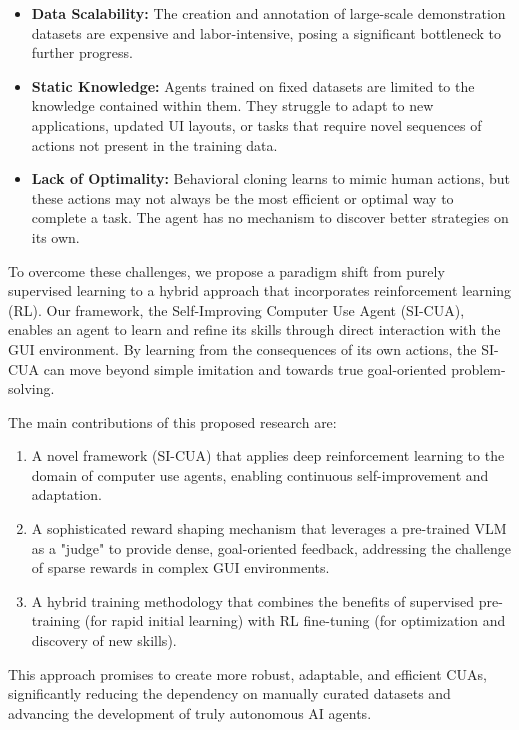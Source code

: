 \documentclass{article}
\begin{document}
\begin{itemize}
    \item \textbf{Data Scalability:} The creation and annotation of large-scale demonstration datasets are expensive and labor-intensive, posing a significant bottleneck to further progress.
    \item \textbf{Static Knowledge:} Agents trained on fixed datasets are limited to the knowledge contained within them. They struggle to adapt to new applications, updated UI layouts, or tasks that require novel sequences of actions not present in the training data.
    \item \textbf{Lack of Optimality:} Behavioral cloning learns to mimic human actions, but these actions may not always be the most efficient or optimal way to complete a task. The agent has no mechanism to discover better strategies on its own.
\end{itemize}

To overcome these challenges, we propose a paradigm shift from purely supervised learning to a hybrid approach that incorporates reinforcement learning (RL). Our framework, the Self-Improving Computer Use Agent (SI-CUA), enables an agent to learn and refine its skills through direct interaction with the GUI environment. By learning from the consequences of its own actions, the SI-CUA can move beyond simple imitation and towards true goal-oriented problem-solving.

The main contributions of this proposed research are:
\begin{enumerate}
    \item A novel framework (SI-CUA) that applies deep reinforcement learning to the domain of computer use agents, enabling continuous self-improvement and adaptation.
    \item A sophisticated reward shaping mechanism that leverages a pre-trained VLM as a "judge" to provide dense, goal-oriented feedback, addressing the challenge of sparse rewards in complex GUI environments.
    \item A hybrid training methodology that combines the benefits of supervised pre-training (for rapid initial learning) with RL fine-tuning (for optimization and discovery of new skills).
\end{enumerate}

This approach promises to create more robust, adaptable, and efficient CUAs, significantly reducing the dependency on manually curated datasets and advancing the development of truly autonomous AI agents.
\end{document}
